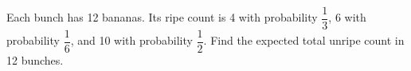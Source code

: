 Each bunch has 12 bananas. Its ripe count is 4 with probability $\dfrac{1}{3}$, 6 with probability $\dfrac{1}{6}$, and 10 with probability $\dfrac{1}{2}$. Find the expected total unripe count in 12 bunches.
